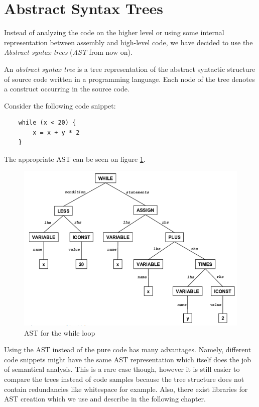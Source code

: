 \section{Abstract Syntax Trees}
\label{sec:AST}

Instead of analyzing the code on the higher level or using some internal representation between assembly and high-level code, we have decided to use the \emph{Abstract syntax trees} (\emph{AST} from now on).

\begin{defn}
    An \emph{abstract syntax tree} is a tree representation of the abstract syntactic structure of source code written in a programming language. Each node of the tree denotes a construct occurring in the source code.
\end{defn}

\begin{exmp}
    Consider the following code snippet:

    \begin{lstlisting}
    while (x < 20) {
        x = x + y * 2
    }
    \end{lstlisting}

    The appropriate AST can be seen on figure \ref{fig:WhileAST}.
\end{exmp}

\begin{figure}[H]
    \centering
    \includegraphics[scale=0.5]{res/WhileAST.PNG}
    \caption{AST for the while loop}
    \label{fig:WhileAST}
\end{figure}

Using the AST instead of the pure code has many advantages. Namely, different code snippets might have the same AST representation which itself does the job of semantical analysis. This is a rare case though, however it is still easier to compare the trees instead of code samples because the tree structure does not contain redundancies like whitespace for example. Also, there exist libraries for AST creation which we use and describe in the following chapter.
